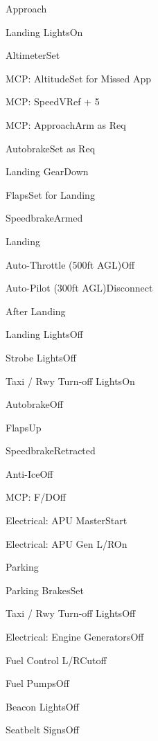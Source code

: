 \documentclass[sim-use, halfpage]{checklist}
\begin{document}
\begin{checklist}{Approach}
  \item{Landing Lights}{On}
  \item{Altimeter}{Set}
  \item{MCP: Altitude}{Set for Missed App}
  \item{MCP: Speed}{VRef + 5}
  \item{MCP: Approach}{Arm as Req}
  \item{Autobrake}{Set as Req}
  \item{Landing Gear}{Down}
  \item{Flaps}{Set for Landing}
  \item{Speedbrake}{Armed} 
\end{checklist}

\begin{checklist}{Landing}
  \item{Auto-Throttle (500ft AGL)}{Off}
  \item{Auto-Pilot (300ft AGL)}{Disconnect}
\end{checklist}

\begin{checklist}{After Landing}
  \item{Landing Lights}{Off}
  \item{Strobe Lights}{Off}
  \item{Taxi / Rwy Turn-off Lights}{On}
  \item{Autobrake}{Off}
  \item{Flaps}{Up}
  \item{Speedbrake}{Retracted}
  \item{Anti-Ice}{Off}
  \item{MCP: F/D}{Off}
  \item{Electrical: APU Master}{Start}
  \item{Electrical: APU Gen L/R}{On}
\end{checklist}

\begin{checklist}{Parking}
  \item{Parking Brakes}{Set}
  \item{Taxi / Rwy Turn-off Lights}{Off}
  \item{Electrical: Engine Generators}{Off}
  \item{Fuel Control L/R}{Cutoff}
  \item{Fuel Pumps}{Off}
  \item{Beacon Lights}{Off}
  \item{Seatbelt Signs}{Off}
\end{checklist}
\end{document}
